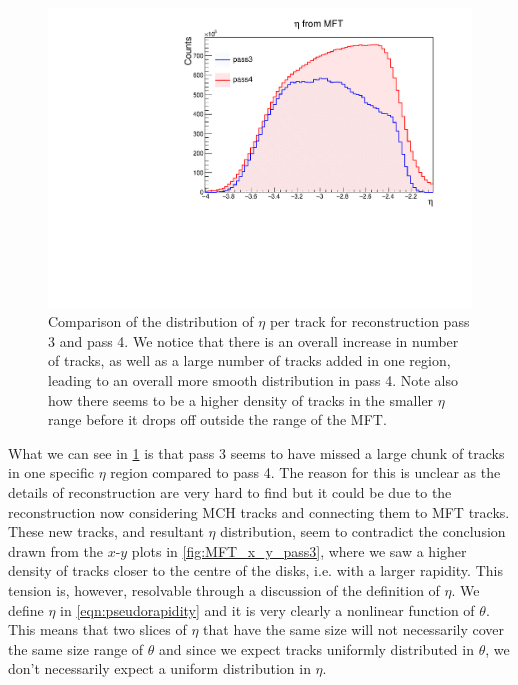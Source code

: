 \begin{figure}[H]
    \begin{center}
        \includegraphics[width=.8\textwidth]{Plots/pass3_pass4.pdf}
        \caption[Comparison of $\eta$ distributions of tracks from pass 3 and pass 4 in the MFT]{Comparison of the distribution of $\eta$ per track for reconstruction pass 3 and pass 4. We notice that there is an overall increase in number of tracks, as well as a large number of tracks added in one region, leading to an overall more smooth distribution in pass 4. Note also how there seems to be a higher density of tracks in the smaller $\eta$ range before it drops off outside the range of the MFT.}
        \label{fig:pass3_pass4_eta}
    \end{center}
\end{figure}

What we can see in \cref{fig:pass3_pass4_eta} is that pass 3 seems to have missed a large chunk of tracks in one specific $\eta$ region compared to pass 4. The reason for this is unclear as the details of reconstruction are very hard to find but it could be due to the reconstruction now considering MCH tracks and connecting them to MFT tracks. These new tracks, and resultant $\eta$ distribution, seem to contradict the conclusion drawn from the $x$-$y$ plots in \cref{fig:MFT_x_y_pass3}, where we saw a higher density of tracks closer to the centre of the disks, i.e. with a larger rapidity. This tension is, however, resolvable through a discussion of the definition of $\eta$. We define $\eta$ in \cref{eqn:pseudorapidity} and it is very clearly a nonlinear function of $\theta$. This means that two slices of $\eta$ that have the same size will not necessarily cover the same size range of $\theta$ and since we expect tracks uniformly distributed in $\theta$, we don't necessarily expect a uniform distribution in $\eta$.

